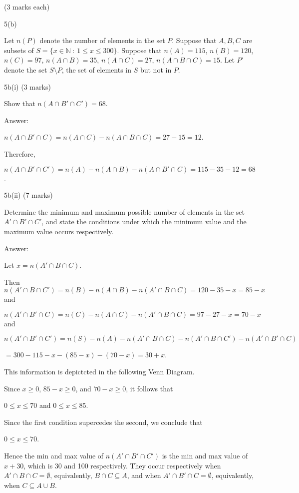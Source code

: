 \documentclass[a4paper,12pt,oneside]{book}
\theoremstyle{definition}
\begin{document}
(3 marks each)

5(b)  

Let $n(P)$ denote the number of elements in the set $P$. Suppose that $A,B,C$ are subsets of $S = \{x \in \mathbb{N} \ : \ 1 \leq x \leq 300 \}$. Suppose that $n(A) = 115$, $n(B) = 120$, $n(C) = 97$, $n(A \cap B) = 35$, $n(A \cap C) = 27$, $n(A \cap B \cap C) = 15$. Let $P'$ denote the set $S \setminus P$, the set of elements in $S$ but not in $P$.

5b(i)  (3 marks)

Show that $n(A \cap B' \cap C') = 68$.

Answer:

$n(A \cap B' \cap C) = n(A \cap C) - n(A \cap B \cap C) = 27 -15 = 12$.

Therefore,

$n(A \cap B' \cap C') = n(A) - n(A \cap B) - n(A \cap B' \cap C) = 115 - 35 - 12 = 68$.

5b(ii) (7 marks) 

Determine the minimum and maximum possible number of elements in the set $A' \cap B' \cap C'$, and state the conditions under which the minimum value and the maximum value occurs respectively.

Answer:

Let $x  = n(A' \cap B \cap C)$.

Then $n(A' \cap B \cap C') = n(B) - n(A \cap B) - n(A' \cap B \cap C) = 120 - 35 - x = 85-x$ and

$n(A' \cap B' \cap C) = n(C) - n(A \cap C) -  n(A' \cap B \cap C) = 97 - 27 - x = 70-x$ and

$n(A' \cap B' \cap C') = n(S) - n(A) - n(A' \cap B \cap C) - n(A' \cap B \cap C') - n(A' \cap B' \cap C)$

$= 300 - 115 - x - (85-x) - (70-x) = 30+x$.

This information is depictcted in the following Venn Diagram.

Since $x \geq 0$, $85-x \geq 0$, and $70-x \geq 0$, it follows that

$0 \leq x \leq 70$ and $0 \leq x \leq 85$. 

Since the first condition supercedes the second, we conclude that 

$0 \leq x \leq 70$.

Hence the min and max value of $n(A' \cap B' \cap C')$ is the min and max value of $x+30$, which is 30 and 100 respectively. They occur respectively when $A' \cap B \cap C = \emptyset$, equivalently, $B \cap C \subseteq A$, and when $A' \cap B' \cap C = \emptyset$, equivalently, when $C \subseteq A \cup B$.
\end{document}
